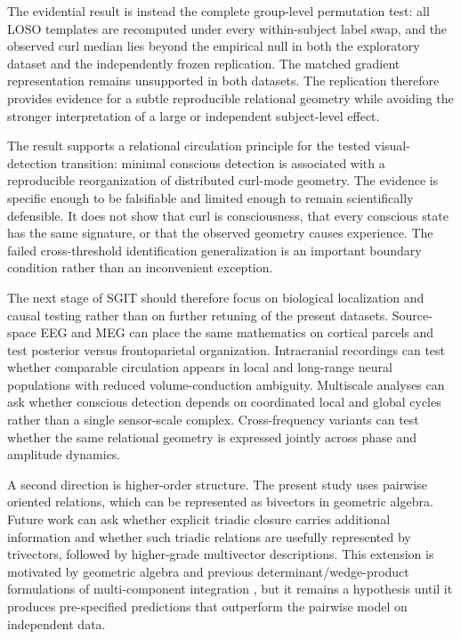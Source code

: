 \documentclass[12pt]{article}
\begin{document}
The evidential result is instead the complete group-level permutation test: all LOSO templates are recomputed under every within-subject label swap, and the observed curl median lies beyond the empirical null in both the exploratory dataset and the independently frozen replication. The matched gradient representation remains unsupported in both datasets. The replication therefore provides evidence for a subtle reproducible relational geometry while avoiding the stronger interpretation of a large or independent subject-level effect.

The result supports a relational circulation principle for the tested visual-detection transition: minimal conscious detection is associated with a reproducible reorganization of distributed curl-mode geometry. The evidence is specific enough to be falsifiable and limited enough to remain scientifically defensible. It does not show that curl is consciousness, that every conscious state has the same signature, or that the observed geometry causes experience. The failed cross-threshold identification generalization is an important boundary condition rather than an inconvenient exception.

The next stage of SGIT should therefore focus on biological localization and causal testing rather than on further retuning of the present datasets. Source-space EEG and MEG can place the same mathematics on cortical parcels and test posterior versus frontoparietal organization. Intracranial recordings can test whether comparable circulation appears in local and long-range neural populations with reduced volume-conduction ambiguity. Multiscale analyses can ask whether conscious detection depends on coordinated local and global cycles rather than a single sensor-scale complex. Cross-frequency variants can test whether the same relational geometry is expressed jointly across phase and amplitude dynamics.

A second direction is higher-order structure. The present study uses pairwise oriented relations, which can be represented as bivectors in geometric algebra. Future work can ask whether explicit triadic closure carries additional information and whether such triadic relations are usefully represented by trivectors, followed by higher-grade multivector descriptions. This extension is motivated by geometric algebra and previous determinant/wedge-product formulations of multi-component integration \citep{HestenesSobczyk1984,Lavor2018,Svitek2024GA}, but it remains a hypothesis until it produces pre-specified predictions that outperform the pairwise model on independent data.
\end{document}
